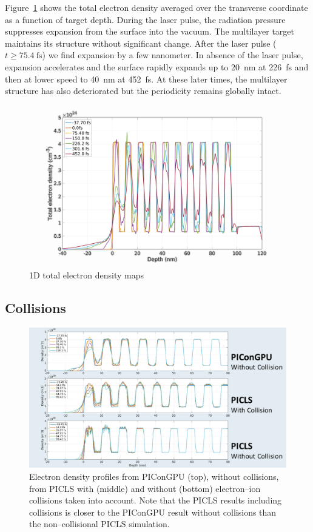 \documentclass[preprint, 12pt]{elsarticle}
\begin{document}
%
Figure~\ref{fig:edens_1D} shows the total electron density averaged over the
transverse coordinate as a function of target depth.
During the laser pulse, the radiation pressure
suppresses expansion from the surface into the vacuum. The multilayer
target maintains its structure without significant change. After the laser pulse
($t\geq \SI{75.4}{\fs}$) we find expansion by a few nanometer. In absence of the
laser pulse, expansion accelerates and the surface rapidly expands up to \SI{20}{\nm} at
\SI{226}{\fs} and then at lower speed to \SI{40}{\nm} at \SI{452}{\fs}.
At these later times, the multilayer structure has also deteriorated but the
periodicity remains globally intact.
%
\begin{figure}[ht]
  \centering%
  \includegraphics[width=0.8\linewidth]{figures/Paper_plot_1D.png}
  \caption{1D total electron density maps}
  \label{fig:edens_1D}
\end{figure}
%
\subsection{Collisions\label{sec:collisions}}
\begin{figure}[ht]
  \begin{center}
    \includegraphics[width=.8\textwidth,angle=0,clip]{figures/ne_profiles_picongpu_vs_picls_collisions}
  \end{center}
  \caption{Electron density profiles from PIConGPU (top), without collisions,
    from PICLS  with (middle) and without (bottom) electron--ion collisions
    taken into account. Note that the PICLS results including collisions is
    closer to the PIConGPU result without collisions than the non--collisional
    PICLS simulation.
  }
  \label{fig:ne_collisions_pic}
\end{figure}
%
\end{document}
